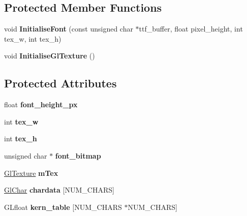 \subsection*{Protected Member Functions}
\begin{DoxyCompactItemize}
\item 
void {\bfseries Initialise\+Font} (const unsigned char $\ast$ttf\+\_\+buffer, float pixel\+\_\+height, int tex\+\_\+w, int tex\+\_\+h)\hypertarget{classpangolin_1_1_gl_font_a3dcadff69ed2b1e9c14141aadc0a0c26}{}\label{classpangolin_1_1_gl_font_a3dcadff69ed2b1e9c14141aadc0a0c26}

\item 
void {\bfseries Initialise\+Gl\+Texture} ()\hypertarget{classpangolin_1_1_gl_font_a714a0f3d3c7466ff01de0b1a0c88b413}{}\label{classpangolin_1_1_gl_font_a714a0f3d3c7466ff01de0b1a0c88b413}

\end{DoxyCompactItemize}
\subsection*{Protected Attributes}
\begin{DoxyCompactItemize}
\item 
float {\bfseries font\+\_\+height\+\_\+px}\hypertarget{classpangolin_1_1_gl_font_a744c738a832f3e1e7f8373509de7c552}{}\label{classpangolin_1_1_gl_font_a744c738a832f3e1e7f8373509de7c552}

\item 
int {\bfseries tex\+\_\+w}\hypertarget{classpangolin_1_1_gl_font_a2e0a85f9080850da13d2e4ba6750a0e6}{}\label{classpangolin_1_1_gl_font_a2e0a85f9080850da13d2e4ba6750a0e6}

\item 
int {\bfseries tex\+\_\+h}\hypertarget{classpangolin_1_1_gl_font_a742a2db1404f9db06b1d736f593af482}{}\label{classpangolin_1_1_gl_font_a742a2db1404f9db06b1d736f593af482}

\item 
unsigned char $\ast$ {\bfseries font\+\_\+bitmap}\hypertarget{classpangolin_1_1_gl_font_a7e03e88ac7aa915a09b243a5cf3df97a}{}\label{classpangolin_1_1_gl_font_a7e03e88ac7aa915a09b243a5cf3df97a}

\item 
\hyperlink{classpangolin_1_1_gl_texture}{Gl\+Texture} {\bfseries m\+Tex}\hypertarget{classpangolin_1_1_gl_font_a5515a6f60ecb444bb18354f5bebce17d}{}\label{classpangolin_1_1_gl_font_a5515a6f60ecb444bb18354f5bebce17d}

\item 
\hyperlink{classpangolin_1_1_gl_char}{Gl\+Char} {\bfseries chardata} \mbox{[}N\+U\+M\+\_\+\+C\+H\+A\+RS\mbox{]}\hypertarget{classpangolin_1_1_gl_font_aede88934c27afe8e81ce16106eab99ae}{}\label{classpangolin_1_1_gl_font_aede88934c27afe8e81ce16106eab99ae}

\item 
G\+Lfloat {\bfseries kern\+\_\+table} \mbox{[}N\+U\+M\+\_\+\+C\+H\+A\+RS $\ast$N\+U\+M\+\_\+\+C\+H\+A\+RS\mbox{]}\hypertarget{classpangolin_1_1_gl_font_a9a3dd53988b84caa55c46eff00c19e2e}{}\label{classpangolin_1_1_gl_font_a9a3dd53988b84caa55c46eff00c19e2e}

\end{DoxyCompactItemize}

